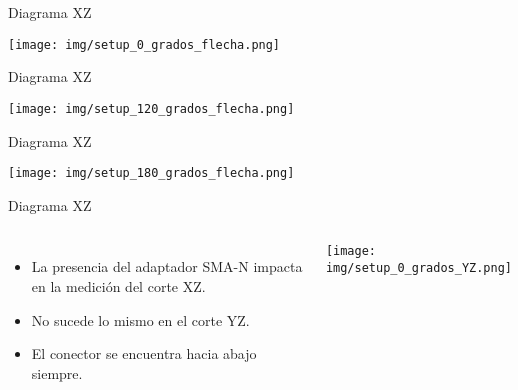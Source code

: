 \begin{frame}{Diagrama XZ}

\begin{center}
    \texttt{[image: img/setup\_0\_grados\_flecha.png]}
\end{center}

\end{frame}

\begin{frame}{Diagrama XZ}

\begin{center}
    \texttt{[image: img/setup\_120\_grados\_flecha.png]}
\end{center}

\end{frame}

\begin{frame}{Diagrama XZ}

\begin{center}
    \texttt{[image: img/setup\_180\_grados\_flecha.png]}
\end{center}

\end{frame}

\begin{frame}{Diagrama XZ}
\begin{columns}
        \begin{itemize}
            \item La presencia del adaptador SMA-N impacta en la medición del corte XZ.
            \item No sucede lo mismo en el corte YZ.
            \item El conector se encuentra hacia abajo siempre.
        \end{itemize}
            \texttt{[image: img/setup\_0\_grados\_YZ.png]}
\end{columns}
\end{frame}